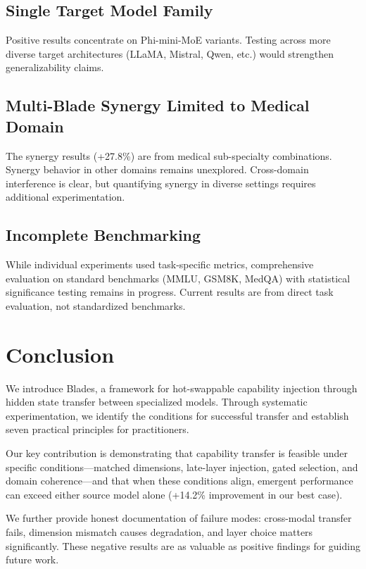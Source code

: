 \documentclass[11pt,a4paper]{article}
\begin{document}
\subsection{Single Target Model Family}
Positive results concentrate on Phi-mini-MoE variants. Testing across more diverse target architectures (LLaMA, Mistral, Qwen, etc.) would strengthen generalizability claims.

\subsection{Multi-Blade Synergy Limited to Medical Domain}
The synergy results (+27.8\%) are from medical sub-specialty combinations. Synergy behavior in other domains remains unexplored. Cross-domain interference is clear, but quantifying synergy in diverse settings requires additional experimentation.

\subsection{Incomplete Benchmarking}
While individual experiments used task-specific metrics, comprehensive evaluation on standard benchmarks (MMLU, GSM8K, MedQA) with statistical significance testing remains in progress. Current results are from direct task evaluation, not standardized benchmarks.

\section{Conclusion}

We introduce Blades, a framework for hot-swappable capability injection through hidden state transfer between specialized models. Through systematic experimentation, we identify the conditions for successful transfer and establish seven practical principles for practitioners.

Our key contribution is demonstrating that capability transfer is feasible under specific conditions---matched dimensions, late-layer injection, gated selection, and domain coherence---and that when these conditions align, emergent performance can exceed either source model alone (+14.2\% improvement in our best case).

We further provide honest documentation of failure modes: cross-modal transfer fails, dimension mismatch causes degradation, and layer choice matters significantly. These negative results are as valuable as positive findings for guiding future work.
\end{document}
